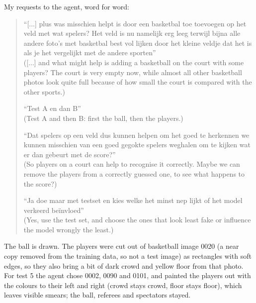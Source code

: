 \documentclass[11pt]{article}
\begin{document}
My requests to the agent, word for word:
\begin{quote}
``[...] plus was misschien helpt is door een basketbal toe toevoegen op het veld
met wat spelers? Het veld is nu namelijk erg leeg terwijl bijna alle andere
foto’s met basketbal best vol lijken door het kleine veldje dat het is als je het
vergelijkt met de andere sporten''\\
([...] and what might help is adding a basketball on the court with some players?
The court is very empty now, while almost all other basketball photos look quite
full because of how small the court is compared with the other sports.)

``Test A en dan B''\\
(Test A and then B: first the ball, then the players.)

``Dat spelers op een veld dus kunnen helpen om het goed te herkennen we kunnen
misschien van een goed gegokte spelers weghalen om te kijken wat er dan gebeurt
met de score?''\\
(So players on a court can help to recognise it correctly. Maybe we can remove the
players from a correctly guessed one, to see what happens to the score?)

``Ja doe maar met testset en kies welke het minst nep lijkt of het model verkeerd
beïnvloed''\\
(Yes, use the test set, and choose the ones that look least fake or influence the
model wrongly the least.)
\end{quote}

The ball is drawn. The players were cut out of basketball image 0020 (a near copy
removed from the training data, so not a test image) as rectangles with soft
edges, so they also bring a bit of dark crowd and yellow floor from that photo.
For test 5 the agent chose 0002, 0090 and 0101, and painted the players out with
the colours to their left and right (crowd stays crowd, floor stays floor), which
leaves visible smears; the ball, referees and spectators stayed.
\end{document}
